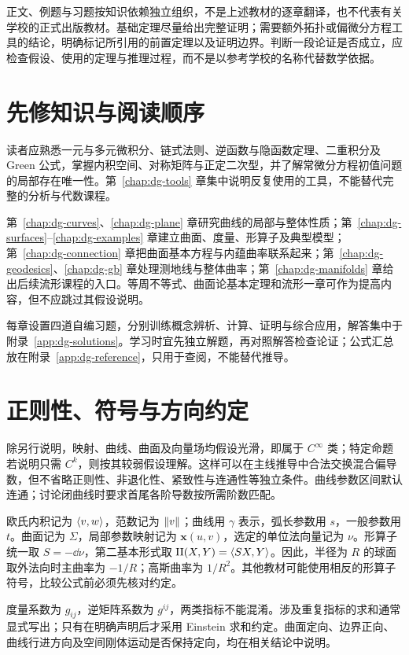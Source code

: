 正文、例题与习题按知识依赖独立组织，不是上述教材的逐章翻译，也不代表有关学校的正式出版教材。基础定理尽量给出完整证明；需要额外拓扑或偏微分方程工具的结论，明确标记所引用的前置定理以及证明边界。判断一段论证是否成立，应检查假设、使用的定理与推理过程，而不是以参考学校的名称代替数学依据。

\section{先修知识与阅读顺序}
读者应熟悉一元与多元微积分、链式法则、逆函数与隐函数定理、二重积分及 Green 公式，掌握内积空间、对称矩阵与正定二次型，并了解常微分方程初值问题的局部存在唯一性。第~\ref{chap:dg-tools} 章集中说明反复使用的工具，不能替代完整的分析与代数课程。

第~\ref{chap:dg-curves}、\ref{chap:dg-plane} 章研究曲线的局部与整体性质；第~\ref{chap:dg-surfaces}--\ref{chap:dg-examples} 章建立曲面、度量、形算子及典型模型；第~\ref{chap:dg-connection} 章把曲面基本方程与内蕴曲率联系起来；第~\ref{chap:dg-geodesics}、\ref{chap:dg-gb} 章处理测地线与整体曲率；第~\ref{chap:dg-manifolds} 章给出后续流形课程的入口。等周不等式、曲面论基本定理和流形一章可作为提高内容，但不应跳过其假设说明。

每章设置四道自编习题，分别训练概念辨析、计算、证明与综合应用，解答集中于附录~\ref{app:dg-solutions}。学习时宜先独立解题，再对照解答检查论证；公式汇总放在附录~\ref{app:dg-reference}，只用于查阅，不能替代推导。

\section{正则性、符号与方向约定}
除另行说明，映射、曲线、曲面及向量场均假设光滑，即属于 $C^\infty$ 类；特定命题若说明只需 $C^k$，则按其较弱假设理解。这样可以在主线推导中合法交换混合偏导数，但不省略正则性、非退化性、紧致性与连通性等独立条件。曲线参数区间默认连通；讨论闭曲线时要求首尾各阶导数按所需阶数匹配。

欧氏内积记为 $\langle v,w\rangle$，范数记为 $\lVert v\rVert$；曲线用 $\gamma$ 表示，弧长参数用 $s$，一般参数用 $t$。曲面记为 $\Sigma$，局部参数映射记为 $\mathbf x(u,v)$，选定的单位法向量记为 $\nu$。形算子统一取 $S=-\dd\nu$，第二基本形式取 $\mathrm{II}(X,Y)=\langle SX,Y\rangle$。因此，半径为 $R$ 的球面取外法向时主曲率为 $-1/R$；高斯曲率为 $1/R^2$。其他教材可能使用相反的形算子符号，比较公式前必须先核对约定。

度量系数为 $g_{ij}$，逆矩阵系数为 $g^{ij}$，两类指标不能混淆。涉及重复指标的求和通常显式写出；只有在明确声明后才采用 Einstein 求和约定。曲面定向、边界正向、曲线行进方向及空间刚体运动是否保持定向，均在相关结论中说明。

